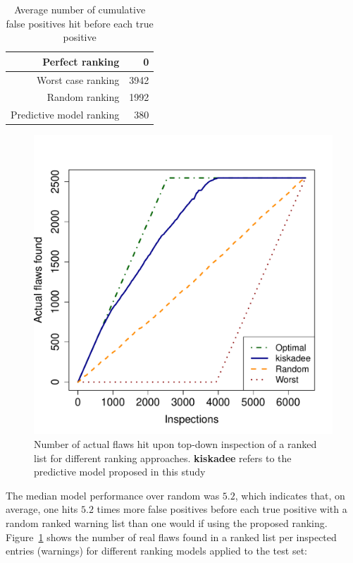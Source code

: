   \begin{table}
    \begin{center}
        \begin{tabular}{|r|r|}
          \hline
          Perfect ranking & 0 \\
          \hline
          Worst case ranking &  3942 \\
          \hline
          Random ranking & 1992 \\
          \hline
          Predictive model ranking & 380 \\
          \hline
        \end{tabular}
        \caption{Average number of cumulative false positives hit before each true positive}\label{tab:avgfp}
    \end{center}
\end{table}


\begin{figure}
\centering
\includegraphics[width=.75\textwidth]{figures/inspections.pdf}
  \caption{Number of actual flaws hit upon top-down inspection of a ranked list for different ranking approaches. \textbf{kiskadee} refers to the predictive model proposed in this study}\label{fig:inspections}
\end{figure}

The median model performance over random was $5.2$, which indicates that, on
average, one hits $5.2$ times more false positives before each true positive with a random ranked
warning list than one would if using the proposed ranking.
Figure~\ref{fig:inspections} shows the number of real flaws found in a ranked
list per inspected entries (warnings) for different ranking models applied to
the test set:

